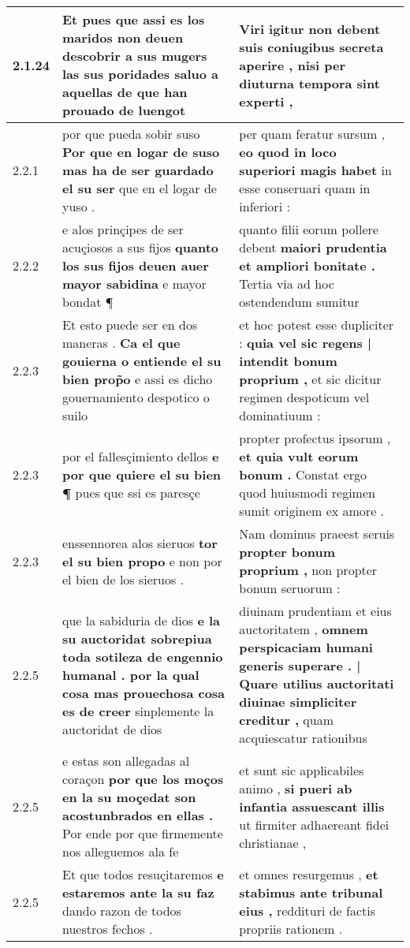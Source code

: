 \begin{tabular}{|p{1cm}|p{6.5cm}|p{6.5cm}|}
2.1.24 & Et pues que assi es los maridos \textbf{ non deuen descobrir a sus mugers las sus poridades } saluo a aquellas de que han prouado de luengot & Viri igitur non debent \textbf{ suis coniugibus secreta aperire , } nisi per diuturna tempora sint experti , \\\hline
2.2.1 & por que pueda sobir suso \textbf{ Por que en logar de suso mas ha de ser guardado el su ser } que en el logar de yuso . & per quam feratur sursum , \textbf{ eo quod in loco superiori magis habet } in esse conseruari quam in inferiori : \\\hline
2.2.2 & e alos prinçipes de ser acuçiosos a sus fijos \textbf{ quanto los sus fijos deuen auer mayor sabidina } e mayor bondat ¶ & quanto filii eorum pollere debent \textbf{ maiori prudentia et ampliori bonitate . } Tertia via ad hoc ostendendum sumitur \\\hline
2.2.3 & Et esto puede ser en dos maneras . \textbf{ Ca el que gouierna o entiende el su bien prop̃o } e assi es dicho gouernamiento despotico o suilo & et hoc potest esse dupliciter : \textbf{ quia vel sic regens | intendit bonum proprium , } et sic dicitur regimen despoticum vel dominatiuum : \\\hline
2.2.3 & por el fallesçimiento dellos \textbf{ e por que quiere el su bien ¶ } pues que ssi es paresçe & propter profectus ipsorum , \textbf{ et quia vult eorum bonum . } Constat ergo quod huiusmodi regimen sumit originem ex amore . \\\hline
2.2.3 & enssennorea alos sieruos \textbf{ tor el su bien propo } e non por el bien de los sieruos . & Nam dominus praeest seruis \textbf{ propter bonum proprium , } non propter bonum seruorum : \\\hline
2.2.5 & que la sabiduria de dios \textbf{ e la su auctoridat sobrepiua toda sotileza de engennio humanal . por la qual cosa mas prouechosa cosa es de creer } sinplemente la auctoridat de dios & diuinam prudentiam et eius auctoritatem , \textbf{ omnem perspicaciam humani generis superare . | Quare utilius auctoritati diuinae simpliciter creditur , } quam acquiescatur rationibus \\\hline
2.2.5 & e estas son allegadas al coraçon \textbf{ por que los moços en la su moçedat son acostunbrados en ellas . } Por ende por que firmemente nos alleguemos ala fe & et sunt sic applicabiles animo , \textbf{ si pueri ab infantia assuescant illis } ut firmiter adhaereant fidei christianae , \\\hline
2.2.5 & Et que todos resuçitaremos \textbf{ e estaremos ante la su faz } dando razon de todos nuestros fechos . & et omnes resurgemus , \textbf{ et stabimus ante tribunal eius , } reddituri de factis propriis rationem . \\\hline

\end{tabular}
